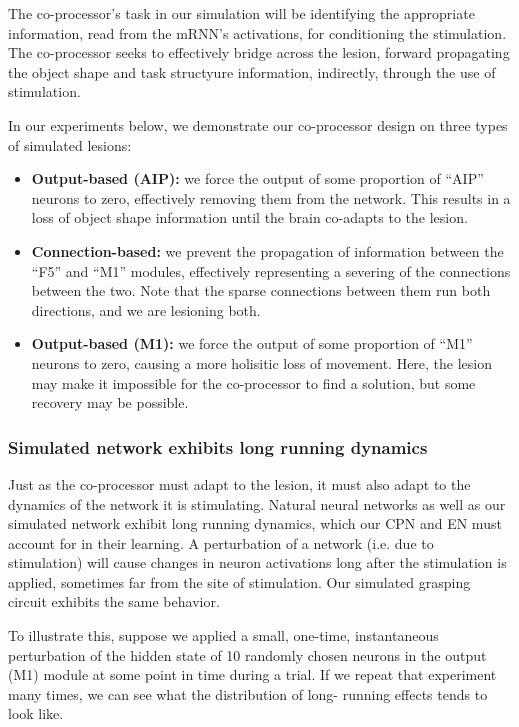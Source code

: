 \documentclass[12pt]{iopart}
\begin{document}
The co-processor's task in our simulation will be identifying the appropriate information,
read from the mRNN's activations, for conditioning the stimulation. The co-processor seeks
to effectively bridge across the lesion, forward propagating the object shape and task
structyure information, indirectly, through the use of stimulation.

In our experiments below, we demonstrate our co-processor design on three types of
simulated lesions:
\begin{itemize}
	\item \textbf{Output-based (AIP):} we force the output of some proportion of ``AIP''
	      neurons to zero, effectively removing them from the network. This results in a
	      loss of object shape information until the brain co-adapts to the lesion.
	\item \textbf{Connection-based:} we prevent the propagation of
	      information between the ``F5'' and ``M1'' modules, effectively representing a
	      severing of the connections between the two. Note that the sparse connections
	      between them run both directions, and we are lesioning both.
	\item \textbf{Output-based (M1):} we force the output of some proportion of ``M1''
	      neurons to zero, causing a more holisitic loss of movement. Here, the lesion
	      may make it impossible for the co-processor to find a solution, but some
	      recovery may be possible.
\end{itemize}

\subsubsection{Simulated network exhibits long running dynamics}
Just as the co-processor must adapt to the lesion, it must also adapt to the dynamics of
the network it is stimulating. Natural neural networks as well as our simulated network
exhibit long running dynamics, which our CPN and EN must account for in their learning.
A perturbation of a network (i.e. due to stimulation) will cause changes in neuron
activations long after the stimulation is applied, sometimes far from the site of
stimulation. Our simulated grasping circuit exhibits the same behavior.

To illustrate this, suppose we applied a small, one-time, instantaneous perturbation
of the hidden state of 10 randomly chosen neurons in the output (M1) module at some point
in time during a trial. If we repeat that experiment many times, we can see what the
distribution of long- running effects tends to look like.
\end{document}
